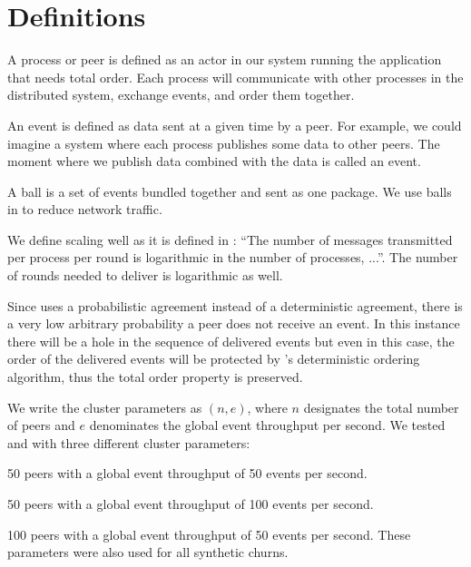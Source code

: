 \section{Definitions}
\label{sec:definitions}
A process or peer is defined as an actor in our system running the application that needs total order. Each process will communicate with other processes in the distributed system, exchange events, and order them together.
\par
An event is defined as data sent at a given time by a peer. For example, we could imagine a system where each process publishes some data to other peers. The moment where we publish data combined with the data is called an event.
\par
A ball is a set of events bundled together and sent as one package. We use balls in \epto to reduce network traffic.

We define \epto scaling well as it is defined in  \autocite{matos2015epto}:  ``The number
of messages transmitted per process per round is logarithmic
in the number of processes, ...''. The number of rounds needed to deliver is logarithmic as well.
\par
Since \epto uses a probabilistic agreement instead of a deterministic agreement, there is a very low arbitrary probability a peer does not receive an event. In this instance there will be a hole in the sequence of delivered events but even in this case, the order of the delivered events will be protected by \epto's deterministic ordering algorithm, thus the total order property is preserved.
\par
We write the cluster parameters as $(n,e)$, where $n$ designates the total number of peers and $e$ denominates the global event throughput per second. We tested \epto and \jgroups with three different cluster parameters:
\begin{description}[\IEEEsetlabelwidth{$(100,100)$:}]
	\item[\textbf{$(50,50)$}:] 50 peers with a global event throughput of 50 events per second.
	\item[\textbf{$(50,100)$}:] 50 peers with a global event throughput of 100 events per second.
	\item[\textbf{$(100,50)$}:] 100 peers with a global event throughput of 50 events per second. These parameters were also used for all synthetic churns.
\end{description}
